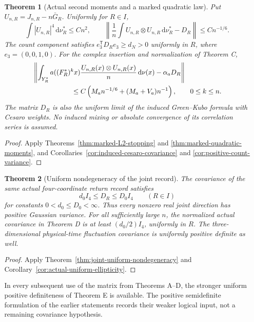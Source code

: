 \documentclass[11pt,reqno]{amsart}
\numberwithin{equation}{section}
\newtheorem{maintheorem}{Theorem}
\theoremstyle{definition}\newtheorem{definition}[theorem]{Definition}
\theoremstyle{remark}\newtheorem{remark}[theorem]{Remark}
\newcommand{\dd}{\,\mathrm d}\newcommand{\one}{\mathbf1}
\begin{document}
\begin{maintheorem}[Actual second moments and a marked quadratic law]
\label{thm:intro-actual-moments}
Put $U_{n,R}=J_{n,R}-n\bar G_R$. Uniformly for $R\in I$,
\[
 \int |U_{n,R}|^4\dd\nu_R^*\le Cn^2,\qquad
 \left\|\frac1n\int U_{n,R}\otimes U_{n,R}\dd\nu_R^*-D_R\right\|
       \le Cn^{-1/6}.
\]
The count component satisfies $e_3^{\mathsf T}D_Re_3\ge d_N>0$
uniformly in $R$, where $e_3=(0,0,1,0)$.
For the complex insertion and normalization of Theorem C,
\begin{align*}
 &\left\|\int_{Y_R^*}a((F_R^*)^kx)
       \frac{U_{n,R}(x)\otimes U_{n,R}(x)}n\dd\nu(x)-\alpha_aD_R\right\|\\
 &\hspace{20mm}\le C\left(M_an^{-1/6}+(M_a+V_a)n^{-1}\right),
       \qquad 0\le k\le n.
\end{align*}
The matrix $D_R$ is also the uniform limit of the induced Green--Kubo
formula with Cesaro weights. No induced mixing or absolute convergence
of its correlation series is assumed.
\end{maintheorem}
\begin{proof}
Apply Theorems~\ref{thm:marked-L2-stopping} and
\ref{thm:marked-quadratic-moments}, and
Corollaries~\ref{cor:induced-cesaro-covariance} and
\ref{cor:positive-count-variance}.
\end{proof}

\begin{maintheorem}[Uniform nondegeneracy of the joint record]
\label{thm:intro-joint-nondegeneracy}
The covariance of the same actual four-coordinate return record satisfies
\[
 d_0 I_4\le D_R\le D_0 I_4\qquad(R\in I)
\]
for constants $0<d_0\le D_0<\infty$. Thus every nonzero real joint
direction has positive Gaussian variance. For all sufficiently large
$n$, the normalized actual covariance in Theorem D is at least
$(d_0/2)I_4$, uniformly in $R$. The three-dimensional physical-time
fluctuation covariance is uniformly positive definite as well.
\end{maintheorem}
\begin{proof}
Apply Theorem~\ref{thm:joint-uniform-nondegeneracy} and
Corollary~\ref{cor:actual-uniform-ellipticity}.
\end{proof}
In every subsequent use of the matrix from Theorems A--D, the stronger
uniform positive definiteness of Theorem E is available. The positive
semidefinite formulation of the earlier statements records their weaker
logical input, not a remaining covariance hypothesis.
\end{document}
